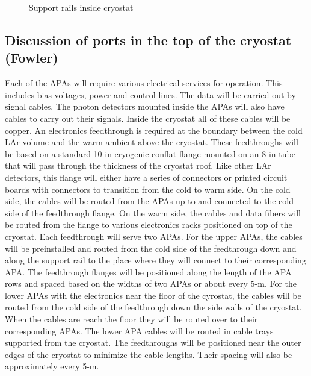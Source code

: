 \begin{figure}[htbp]
\centering
\caption{Support rails inside cryostat} 
\label{fig:support-rails}
\end{figure}

\subsection{Discussion of ports in the top of the cryostat (Fowler)}
\label{fd:install:integ:topports}

Each of the APAs will require various electrical services for operation.  This includes bias voltages, power and control lines.  The data will be carried out by signal cables.  The photon detectors mounted inside the APAs will also have cables to carry out their signals.  Inside the cryostat all of these cables will be copper.  
An electronics feedthrough is required at the boundary between the cold LAr volume and the warm ambient above the cryostat.  These feedthroughs will be based on a standard 10-in cryogenic conflat flange mounted on an 8-in tube that will pass through the thickness of the cryostat roof.  Like other LAr detectors, this flange will either have a series of connectors or printed circuit boards with connectors to transition from the cold to warm side.  On the cold side, the cables will be routed from the APAs up to and connected to the cold side of the feedthrough flange.  On the warm side, the cables and data fibers will be routed from the flange to various electronics racks positioned on top of the cryostat.  
Each feedthrough will serve two APAs.  For the upper APAs, the cables will be preinstalled and routed from the cold side of the feedthrough down and along the support rail to the place where they will connect to their corresponding APA.  The feedthrough flanges will be positioned along the length of the APA rows and spaced based on the widths of two APAs or about every 5-m.   For the lower APAs with the electronics near the floor of the cyrostat, the cables will be routed from the cold side of the feedthrough down the side walls of the cryostat.  When the cables are reach the floor they will be routed over to their corresponding APAs.  The lower APA cables will be routed in cable trays supported from the cryostat.  The feedthroughs will be positioned near the outer edges of the cryostat to minimize the cable lengths.  Their spacing will also be approximately every 5-m.  




